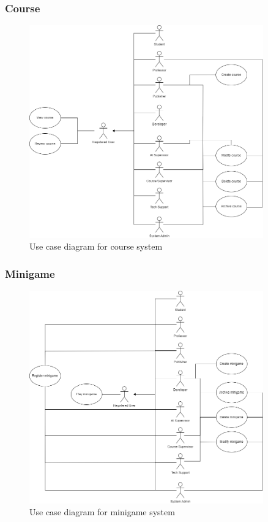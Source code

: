 \newpage
\subsubsection{Course}
\begin{figure}[h]
	\centering
	\includegraphics[width=0.9\textwidth]{images/UC-course.png}
	\caption{Use case diagram for course system}
	\label{fig:UC-course}
\end{figure}

\newpage
\subsubsection{Minigame}
\begin{figure}[h]
	\centering
	\includegraphics[width=0.9\textwidth]{images/UC-minigame.png}
	\caption{Use case diagram for minigame system}
	\label{fig:UC-course}
\end{figure}
